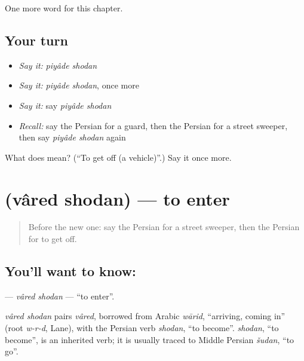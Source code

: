 \begin{grammarlens}[title={What you've built}]
One more word for this chapter.
\end{grammarlens}

\subsection*{Your turn}
\begin{itemize}
\raggedright
  \item \emph{Say it:} \emph{piyâde shodan}
  \item \emph{Say it:} \emph{piyâde shodan}, once more
  \item \emph{Say it:} say \emph{piyâde shodan}
  \item \emph{Recall:} say the Persian for a guard, then the Persian for a street sweeper, then say \emph{piyâde shodan} again
\end{itemize}

\begin{tcolorbox}[breakable,colback=teal!4,colframe=teal!35!black,title={Before you move on}]
What does   mean? (\textquotedblleft{}To get off (a vehicle)\textquotedblright{}.) Say it once more.
\end{tcolorbox}
\section[\texorpdfstring{\fa{وارد} \fa{شدن} (vâred shodan)}{وارد شدن (vâred shodan)}]{  (vâred shodan) — to enter}

\label{lesson:FA-C253-vared-shodan}



\begin{quote}
Before the new one: say the Persian for a street sweeper, then the Persian for to get off.
\end{quote}

\subsection*{You'll want to know:  }
\textbf{ } — \emph{vâred shodan} — \textquotedblleft{}to enter\textquotedblright{}.

\begin{cousinweb}
\emph{vâred shodan} pairs \emph{vâred}, borrowed from Arabic \emph{wārid}, \textquotedblleft{}arriving, coming in\textquotedblright{} (root \emph{w-r-d}, Lane), with the Persian verb \emph{shodan}, \textquotedblleft{}to become\textquotedblright{}. \emph{shodan}, \textquotedblleft{}to become\textquotedblright{}, is an inherited verb; it is usually traced to Middle Persian \emph{šudan}, \textquotedblleft{}to go\textquotedblright{}.
\end{cousinweb}

